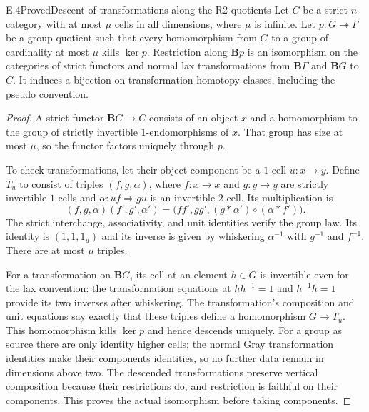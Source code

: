 \begin{claim}{E.4}{Proved}{Descent of transformations along the R2 quotients}
Let $C$ be a strict $n$-category with at most $\mu$ cells in all dimensions, where $\mu$ is infinite. Let $p:G\twoheadrightarrow\Gamma$ be a group quotient such that every homomorphism from $G$ to a group of cardinality at most $\mu$ kills $\ker p$. Restriction along $\mathbf Bp$ is an isomorphism on the categories of strict functors and normal lax transformations from $\mathbf B\Gamma$ and $\mathbf BG$ to $C$. It induces a bijection on transformation-homotopy classes, including the pseudo convention.
\end{claim}
\begin{proof}
A strict functor $\mathbf BG\to C$ consists of an object $x$ and a homomorphism to the group of strictly invertible $1$-endomorphisms of $x$. That group has size at most $\mu$, so the functor factors uniquely through $p$.

To check transformations, let their object component be a $1$-cell $u:x\to y$. Define $T_u$ to consist of triples $(f,g,\alpha)$, where $f:x\to x$ and $g:y\to y$ are strictly invertible $1$-cells and $\alpha:uf\Rightarrow gu$ is an invertible $2$-cell. Its multiplication is
\[
 (f,g,\alpha)(f',g',\alpha')
 =\bigl(ff',gg',(g\ast\alpha')\circ(\alpha\ast f')\bigr).
\]
The strict interchange, associativity, and unit identities verify the group law. Its identity is $(1,1,1_u)$ and its inverse is given by whiskering $\alpha^{-1}$ with $g^{-1}$ and $f^{-1}$. There are at most $\mu$ triples.

For a transformation on $\mathbf BG$, its cell at an element $h\in G$ is invertible even for the lax convention: the transformation equations at $hh^{-1}=1$ and $h^{-1}h=1$ provide its two inverses after whiskering. The transformation's composition and unit equations say exactly that these triples define a homomorphism $G\to T_u$. This homomorphism kills $\ker p$ and hence descends uniquely. For a group as source there are only identity higher cells; the normal Gray transformation identities make their components identities, so no further data remain in dimensions above two. The descended transformations preserve vertical composition because their restrictions do, and restriction is faithful on their components. This proves the actual isomorphism before taking components.
\end{proof}

